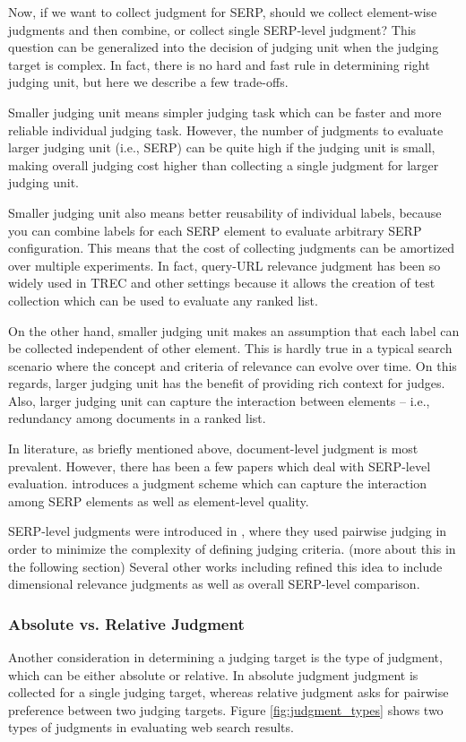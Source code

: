 \documentclass[openany]{now} %
\newcommand{\authornote}[3]{\marginpar{\tiny\color{#1}#2: #3}{\color{#1}{$\star$}}}
\newcommand{\paul}[1]{\authornote{blue}{Paul}{#1}}
\begin{document}
Now, if we want to collect judgment for SERP, should we collect element-wise judgments and then combine, or collect single SERP-level judgment? This question can be generalized into the decision of judging unit when the judging target is complex. In fact, there is no hard and fast rule in determining right judging unit, but here we describe a few trade-offs. 

Smaller judging unit means simpler judging task which can be faster and more reliable individual judging task. However, the number of judgments to evaluate larger judging unit (i.e., SERP) can be quite high if the judging unit is small, making overall judging cost higher than collecting a single judgment for larger judging unit.

Smaller judging unit also means better reusability of individual labels, because you can combine labels for each SERP element to evaluate arbitrary SERP configuration. This means that the cost of collecting judgments can be amortized over multiple experiments. In fact, query-URL relevance judgment has been so widely used in TREC and other settings because it allows the creation of test collection which can be used to evaluate any ranked list.

On the other hand, smaller judging unit makes an assumption that each label can be collected independent of other element. This is hardly true in a typical search scenario where the concept and criteria of relevance can evolve over time. On this regards, larger judging unit has the benefit of providing rich context for judges. Also, larger judging unit can capture the interaction between elements -- i.e., redundancy among documents in a ranked list.

In literature, as briefly mentioned above, document-level judgment is most prevalent. However, there has been a few papers which deal with SERP-level evaluation. \cite{Bailey2010} introduces a judgment scheme which can capture the interaction among SERP elements as well as element-level quality. 

SERP-level judgments were introduced in \cite{Thomas2006}, where they used pairwise judging in order to minimize the complexity of defining judging criteria. (more about this in the following section) Several other works including  \cite{Kim:2013} refined this idea to include dimensional relevance judgments as well as overall SERP-level comparison.
\paul{Add work by Falk et al.\ on judging snippets}

\subsubsection{Absolute vs. Relative Judgment}
Another consideration in determining a judging target is the type of judgment, which can be either absolute or relative. In absolute judgment judgment is collected for a single judging target, whereas relative judgment asks for pairwise preference between two judging targets. Figure \ref{fig:judgment_types} shows two types of judgments in evaluating web search results.
\end{document}
